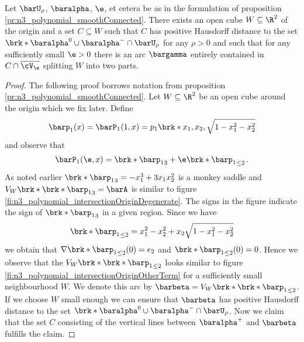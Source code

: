 \begin{proposition}\label{pr:n3_polynomial_regularH}
  Let $\barU_\rho$, $\baralpha$, $\e$, et cetera be as in the formulation of proposition \ref{pr:n3_polynomial_smoothConnected}.
  There exists an open cube $W\subseteq\R^2$ of the origin and a set 
  $C\subseteq W$ such that $C$ has positive Hausdorff distance to the set
  $\brk*{\baralpha^0\cup\baralpha^-}\cap \barU_\rho$ for any $\rho>0$
  and such that for any sufficiently small $\e>0$ there is an arc $\bargamma$
  entirely contained in $C\cap\overline{\cV_\e}$ splitting $W$ into two parts.
\end{proposition}
\begin{proof}
  The following proof borrows notation from proposition \ref{pr:n3_polynomial_smoothConnected}.
  Let $W\subseteq\R^2$ be an open cube around the origin which we fix later.
  Define
  \begin{align*}
    \barp_1(x)=\barP_1(1,x)=p_1\brk*{x_1,x_2,\sqrt{1-x_1^2-x_2^2}}
  \end{align*}
  and observe that
  \begin{align}
    \barP_1(\e,x)=\brk*{\barp_1}_3+\e\brk*{\barp_1}_{\leq2}\,.
  \end{align}
  As noted earlier $\brk*{\barp_1}_3=-x_1^3+3x_1x_2^2$ is a monkey saddle
  and $V_W\brk*{\brk*{\barp_1}_3}=\barA$ is
  similar to figure \ref{fi:n3_polynomial_intersectionOriginDegenerate}.
  The signs in the figure indicate the sign of $\brk*{\barp_1}_3$ in a given region.
  Since we have
  $$\brk*{\barp_1}_{\leq2}=x_1^2-x_2^2+x_2\sqrt{1-x_1^2-x_2^2}$$
  we obtain that $\nabla \brk*{\barp_1}_{\leq2}(0)=e_2$ and $\brk*{\barp_1}_{\leq2}(0)=0$.
  Hence we observe that the $V_W\brk*{\brk*{\barp_1}_{\leq2}}$ looks similar to figure \ref{fi:n3_polynomial_intersectionOriginOtherTerm}
  for a sufficiently small neighbourhood $W$.
  We denote this arc by $\barbeta=V_W\brk*{\brk*{\barp_1}_{\leq2}}$.
  If we choose $W$ small enough we can ensure that $\barbeta$ has positive Hausdorff distance to
  the set $\brk*{\baralpha^0\cup\baralpha^-}\cap \barU_\rho$.
  Now we claim that the set $C$ consisting of the vertical lines between $\baralpha^+$
  and $\barbeta$ fulfills the claim.
  

\end{proof}
